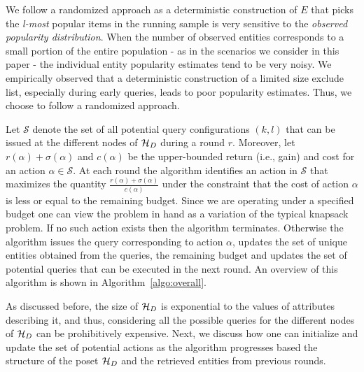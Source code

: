 We follow a randomized approach as a deterministic construction of $E$ that picks the {\em l-most} popular items in the running sample is very sensitive to the {\em observed popularity distribution}. When the number of observed entities corresponds to a small portion of the entire population - as in the scenarios we consider in this paper - the individual entity popularity estimates tend to be very noisy.  We empirically observed that a deterministic construction of a limited size exclude list, especially during early queries, leads to poor popularity estimates. Thus, we choose to follow a randomized approach.

Let $\mathcal{S}$ denote the set of all potential query configurations $(k,l)$ that can be issued at the different nodes of $\mathcal{H}_D$ during a round $r$. Moreover, let $r(\alpha) + \sigma(\alpha)$ and $c(\alpha)$ be the upper-bounded return (i.e., gain) and cost for an action $\alpha \in \mathcal{S}$. At each round the algorithm identifies an action in $\mathcal{S}$ that maximizes the quantity $\frac{r(\alpha) + \sigma(\alpha)}{c(\alpha)}$ under the constraint that the cost of action $\alpha$ is less or equal to the remaining budget. Since we are operating under a specified budget one can view the problem in hand as a variation of the typical knapsack problem. If no such action exists then the algorithm terminates. Otherwise the algorithm issues the query corresponding to action $\alpha$, updates the set of unique entities obtained from the queries, the remaining budget and updates the set of potential queries that can be executed in the next round.  An overview of this algorithm is shown in Algorithm~\ref{algo:overall}. 

As discussed before, the size of $\mathcal{H}_D$ is exponential to the values of attributes describing it, and thus, considering all the possible queries for the different nodes of $\mathcal{H}_D$ can be prohibitively expensive. Next, we discuss how one can initialize and update the set of potential actions as the algorithm progresses based the structure of the poset $\mathcal{H}_D$ and the retrieved entities from previous rounds. 

